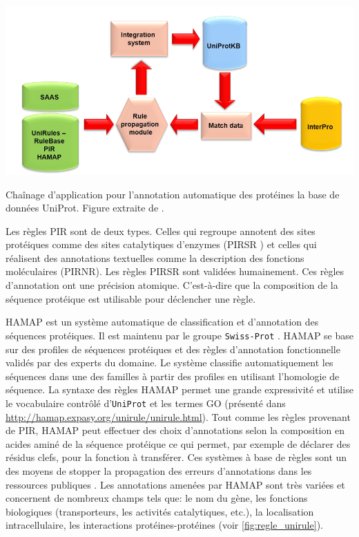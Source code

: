 \begin{refsegment}
    \begin{shadedfigure}[H]
        \centering
        \includegraphics[width=\textwidth]{img/unirule.png}
        \caption{ Chaînage d'application pour l'annotation automatique des protéines la base de données UniProt. Figure extraite de . }
        \label{fig:unirule}
    \end{shadedfigure}

    Les règles \acrshort{PIR} sont de deux types. Celles qui regroupe annotent des sites protéiques comme des sites catalytiques d’enzymes (\acrfull{PIRSR} \cite{vasudevan2011structure}) et celles qui réalisent des annotations textuelles comme la description des fonctions moléculaires (\acrfull{PIRNR}). Les règles \acrfull{PIRSR} sont validées humainement. Ces règles d'annotation ont une précision atomique. C'est-à-dire que la composition de la séquence protéique est utilisable pour déclencher une règle.
    
    \gls{HAMAP} est un système automatique de classification et d'annotation des séquences protéiques. Il est maintenu par le groupe \texttt{Swiss-Prot} . \gls{HAMAP} se base sur des profiles de séquences protéiques et des règles d'annotation fonctionnelle validés par des experts du domaine. Le système classifie automatiquement les séquences dans une des familles à partir des profiles en utilisant l’homologie de séquence. La syntaxe des règles  \gls{HAMAP} permet une grande expressivité et utilise le vocabulaire contrôlé d'\texttt{UniProt} et les termes \gls{GO} (présenté dans \url{http://hamap.expasy.org/unirule/unirule.html}). Tout comme les règles provenant de \gls{PIR}, \gls{HAMAP} peut effectuer des choix d'annotations selon la composition en acides aminé de la séquence protéique ce qui permet, par exemple de déclarer des résidus clefs, pour la fonction à transférer. Ces systèmes à base de règles sont un des moyens de stopper la propagation des erreurs d'annotations dans les ressources publiques \cite{schnoes2009annotation,devos2001intrinsic,bell2013can,gilks2002modeling}. Les annotations amenées par \gls{HAMAP} sont très variées et concernent de nombreux champs tels que: le nom du gène, les fonctions biologiques (transporteurs, les activités catalytiques, etc.), la localisation intracellulaire, les interactions protéines-protéines (voir \cref{fig:regle_unirule}).
    

\end{refsegment}
